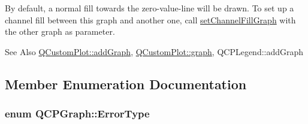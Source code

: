 By default, a normal fill towards the zero-\/value-\/line will be drawn. To set up a channel fill between this graph and another one, call \hyperlink{classQCPGraph_a2d03156df1b64037a2e36cfa50351ca3}{set\-Channel\-Fill\-Graph} with the other graph as parameter.

\begin{DoxySeeAlso}{See Also}
\hyperlink{classQCustomPlot_a6fb2873d35a8a8089842d81a70a54167}{Q\-Custom\-Plot\-::add\-Graph}, \hyperlink{classQCustomPlot_a6d3ed93c2bf46ab7fa670d66be4cddaf}{Q\-Custom\-Plot\-::graph}, Q\-C\-P\-Legend\-::add\-Graph 
\end{DoxySeeAlso}


\subsection{Member Enumeration Documentation}
\hypertarget{classQCPGraph_ad23b514404bd2cb3216f57c90904d6af}{
\subsubsection[{Error\-Type}]{\setlength{\rightskip}{0pt plus 5cm}enum {\bf Q\-C\-P\-Graph\-::\-Error\-Type}}}\label{classQCPGraph_ad23b514404bd2cb3216f57c90904d6af}
